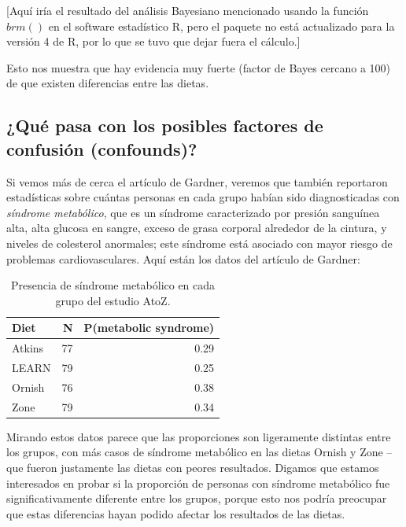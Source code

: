 \documentclass[
  12pt,
]{book}
\theoremstyle{definition}
\theoremstyle{definition}
\theoremstyle{definition}
\theoremstyle{remark}
\begin{document}
{[}Aquí iría el resultado del análisis Bayesiano mencionado usando la función \(brm()\) en el software estadístico R, pero el paquete no está actualizado para la versión 4 de R, por lo que se tuvo que dejar fuera el cálculo.{]}

Esto nos muestra que hay evidencia muy fuerte (factor de Bayes cercano a 100) de que existen diferencias entre las dietas.

\hypertarget{quuxe9-pasa-con-los-posibles-factores-de-confusiuxf3n-confounds}{%
\subsection{¿Qué pasa con los posibles factores de confusión (confounds)?}\label{quuxe9-pasa-con-los-posibles-factores-de-confusiuxf3n-confounds}}

Si vemos más de cerca el artículo de Gardner, veremos que también reportaron estadísticas sobre cuántas personas en cada grupo habían sido diagnosticadas con \emph{síndrome metabólico}, que es un síndrome caracterizado por presión sanguínea alta, alta glucosa en sangre, exceso de grasa corporal alrededor de la cintura, y niveles de colesterol anormales; este síndrome está asociado con mayor riesgo de problemas cardiovasculares. Aquí están los datos del artículo de Gardner:

\begin{table}

\caption{\label{tab:unnamed-chunk-131}Presencia de síndrome metabólico en cada grupo del estudio AtoZ.}
\centering
\begin{tabular}[t]{l|r|r}
\hline
Diet & N & P(metabolic syndrome)\\
\hline
Atkins & 77 & 0.29\\
\hline
LEARN & 79 & 0.25\\
\hline
Ornish & 76 & 0.38\\
\hline
Zone & 79 & 0.34\\
\hline
\end{tabular}
\end{table}

Mirando estos datos parece que las proporciones son ligeramente distintas entre los grupos, con más casos de síndrome metabólico en las dietas Ornish y Zone -- que fueron justamente las dietas con peores resultados. Digamos que estamos interesados en probar si la proporción de personas con síndrome metabólico fue significativamente diferente entre los grupos, porque esto nos podría preocupar que estas diferencias hayan podido afectar los resultados de las dietas.
\end{document}
